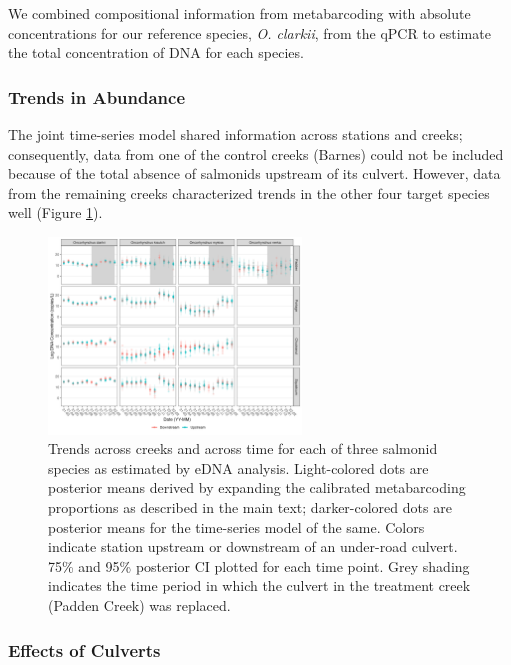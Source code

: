 \documentclass[
]{article}
\begin{document}
We combined compositional information from metabarcoding with absolute
concentrations for our reference species, \emph{O. clarkii}, from the
qPCR to estimate the total concentration of DNA for each species.

\hypertarget{trends-in-abundance}{%
\subsubsection{Trends in Abundance}\label{trends-in-abundance}}

The joint time-series model shared information across stations and
creeks; consequently, data from one of the control creeks (Barnes) could
not be included because of the total absence of salmonids upstream of
its culvert. However, data from the remaining creeks characterized
trends in the other four target species well (Figure \ref{fig:ts}).

\begin{figure}
\centering
\includegraphics[width=0.6\textwidth,height=\textheight]{../Output/Figures/20221129_multispeciesTrends_flowcorrected.png}
\caption{Trends across creeks and across time for each of three salmonid
species as estimated by eDNA analysis. Light-colored dots are posterior
means derived by expanding the calibrated metabarcoding proportions as
described in the main text; darker-colored dots are posterior means for
the time-series model of the same. Colors indicate station upstream or
downstream of an under-road culvert. 75\% and 95\% posterior CI plotted
for each time point. Grey shading indicates the time period in which the
culvert in the treatment creek (Padden Creek) was
replaced.\label{fig:ts}}
\end{figure}

\hypertarget{effects-of-culverts}{%
\subsubsection{Effects of Culverts}\label{effects-of-culverts}}
\end{document}
